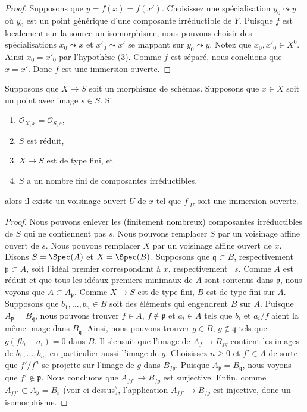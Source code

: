 \begin{proof}
Supposons que $y = f(x) = f(x')$. Choisissez une spécialisation $y_0 \leadsto y$
où $y_0$ est un point générique d'une composante irréductible de $Y$. Puisque
$f$ est localement sur la source un isomorphisme, nous pouvons choisir des
spécialisations $x_0 \leadsto x$ et $x'_0 \leadsto x'$ se mappant sur $y_0
\leadsto y$. Notez que $x_0, x'_0 \in X^0$. Ainsi $x_0 = x'_0$ par l'hypothèse (3).
Comme $f$ est séparé, nous concluons que $x = x'$. Donc $f$ est une immersion ouverte.
\end{proof}

\begin{lemma}
\label{lemma-local-isomorphism}
Supposons que $X \to S$ soit un morphisme de schémas.
Supposons que $x \in X$ soit un point avec image $s \in S$. Si
\begin{enumerate}
\item $\mathcal{O}_{X, x} =
\mathcal{O}_{S, s}$, \item $S$ est réduit,
\item $X \to S$ est de type fini, et \item $S$
a un nombre fini de composantes irréductibles,
\end{enumerate}
alors il existe un voisinage ouvert $U$ de
$x$ tel que $f|_U$ soit une immersion ouverte.
\end{lemma}

\begin{proof}
Nous pouvons enlever les (finitement nombreux) composantes
irréductibles de $S$ qui ne contiennent pas $s$. Nous pouvons
remplacer $S$ par un voisinage affine ouvert de $s$. Nous pouvons
remplacer $X$ par un voisinage affine ouvert de $x$. Disons $S =
\Spec(A)$ et $X = \Spec(B)$. Supposons que $\mathfrak q \subset B$,
respectivement \ $\mathfrak p \subset A$, soit l'idéal premier
correspondant à $x$, respectivement \ $s$. Comme $A$ est réduit et que
tous les idéaux premiers minimaux de $A$ sont contenus dans $\mathfrak
p$, nous voyons que $A \subset A_\mathfrak p$. Comme $X \to S$ est de
type fini, $B$ est de type fini sur $A$. Supposons que $b_1, \ldots,
b_n \in B$ soit des éléments qui engendrent $B$ sur $A$. Puisque
$A_\mathfrak p = B_\mathfrak q$, nous pouvons trouver $f \in A$, $f \not
\in \mathfrak p$ et $a_i \in A$ tels que $b_i$ et $a_i/f$ aient la même
image dans $B_\mathfrak q$. Ainsi, nous pouvons trouver $g \in B$, $g
\not \in \mathfrak q$ tels que $g(fb_i - a_i) = 0$ dans $B$. Il s'ensuit
que l'image de $A_f \to B_{fg}$ contient les images de $b_1, \ldots,
b_n$, en particulier aussi l'image de $g$. Choisissez $n \geq 0$ et $f'
\in A$ de sorte que $f'/f^n$ se projette sur l'image de $g$ dans
$B_{fg}$. Puisque $A_\mathfrak p = B_\mathfrak q$, nous voyons que $f' \not
\in \mathfrak p$. Nous concluons que $A_{ff'} \to B_{fg}$ est surjective.
Enfin, comme $A_{ff'} \subset A_\mathfrak p = B_\mathfrak q$ (voir
ci-dessus), l'application $A_{ff'} \to B_{fg}$ est injective, donc un isomorphisme.
\end{proof}


